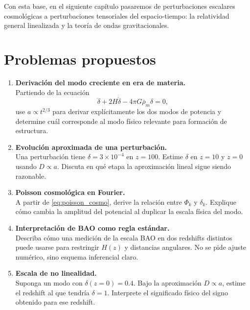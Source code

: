 Con esta base, en el siguiente capítulo pasaremos de perturbaciones escalares cosmológicas a perturbaciones tensoriales del espacio-tiempo: la relatividad general linealizada y la teoría de ondas gravitacionales.

\section*{Problemas propuestos}

\begin{enumerate}[leftmargin=2.2em, label=\textbf{P\arabic*.}]

\item \textbf{Derivación del modo creciente en era de materia.} \\
Partiendo de la ecuación
\begin{equation*}
\ddot\delta+2H\dot\delta-4\pi G\bar\rho_m\delta=0,
\end{equation*}
use $a\propto t^{2/3}$ para derivar explícitamente los dos modos de potencia y determine cuál corresponde al modo físico relevante para formación de estructura.

\item \textbf{Evolución aproximada de una perturbación.} \\
Una perturbación tiene $\delta=3\times10^{-4}$ en $z=100$. Estime $\delta$ en $z=10$ y $z=0$ usando $D\propto a$. Discuta en qué etapa la aproximación lineal sigue siendo razonable.

\item \textbf{Poisson cosmológica en Fourier.} \\
A partir de \eqref{eq:poisson_cosmo}, derive la relación entre $\Phi_k$ y $\delta_k$. Explique cómo cambia la amplitud del potencial al duplicar la escala física del modo.

\item \textbf{Interpretación de BAO como regla estándar.} \\
Describa cómo una medición de la escala BAO en dos redshifts distintos puede usarse para restringir $H(z)$ y distancias angulares. No se pide ajuste numérico, sino esquema inferencial claro.

\item \textbf{Escala de no linealidad.} \\
Suponga un modo con $\delta(z=0)=0.4$. Bajo la aproximación $D\propto a$, estime el redshift al que tendría $\delta=1$. Interprete el significado físico del signo obtenido para ese redshift.


\end{enumerate}
